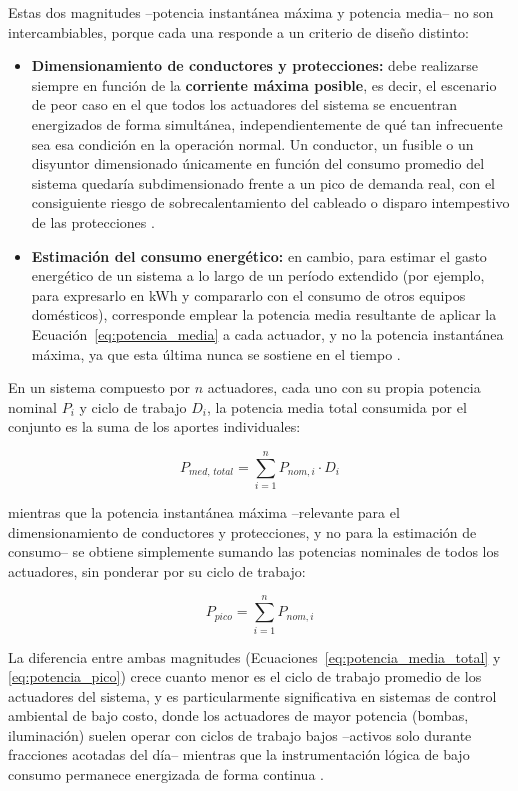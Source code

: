 Estas dos magnitudes --potencia instantánea máxima y potencia media-- no son intercambiables, porque cada una responde a un criterio de diseño distinto:

\begin{itemize}
    \item \textbf{Dimensionamiento de conductores y protecciones:} debe realizarse siempre en función de la \textbf{corriente máxima posible}, es decir, el escenario de peor caso en el que todos los actuadores del sistema se encuentran energizados de forma simultánea, independientemente de qué tan infrecuente sea esa condición en la operación normal. Un conductor, un fusible o un disyuntor dimensionado únicamente en función del consumo promedio del sistema quedaría subdimensionado frente a un pico de demanda real, con el consiguiente riesgo de sobrecalentamiento del cableado o disparo intempestivo de las protecciones \cite{nfpa70_2023}.
    \item \textbf{Estimación del consumo energético:} en cambio, para estimar el gasto energético de un sistema a lo largo de un período extendido (por ejemplo, para expresarlo en kWh y compararlo con el consumo de otros equipos domésticos), corresponde emplear la potencia media resultante de aplicar la Ecuación~\ref{eq:potencia_media} a cada actuador, y no la potencia instantánea máxima, ya que esta última nunca se sostiene en el tiempo \cite{rashid2014power}.
\end{itemize}

En un sistema compuesto por $n$ actuadores, cada uno con su propia potencia nominal $P_i$ y ciclo de trabajo $D_i$, la potencia media total consumida por el conjunto es la suma de los aportes individuales:

\begin{equation}
    P_{med,\,total} = \sum_{i=1}^{n} P_{nom,i} \cdot D_i
    \label{eq:potencia_media_total}
\end{equation}

\noindent mientras que la potencia instantánea máxima --relevante para el dimensionamiento de conductores y protecciones, y no para la estimación de consumo-- se obtiene simplemente sumando las potencias nominales de todos los actuadores, sin ponderar por su ciclo de trabajo:

\begin{equation}
    P_{pico} = \sum_{i=1}^{n} P_{nom,i}
    \label{eq:potencia_pico}
\end{equation}

La diferencia entre ambas magnitudes (Ecuaciones~\ref{eq:potencia_media_total} y \ref{eq:potencia_pico}) crece cuanto menor es el ciclo de trabajo promedio de los actuadores del sistema, y es particularmente significativa en sistemas de control ambiental de bajo costo, donde los actuadores de mayor potencia (bombas, iluminación) suelen operar con ciclos de trabajo bajos --activos solo durante fracciones acotadas del día-- mientras que la instrumentación lógica de bajo consumo permanece energizada de forma continua \cite{rashid2014power}.

